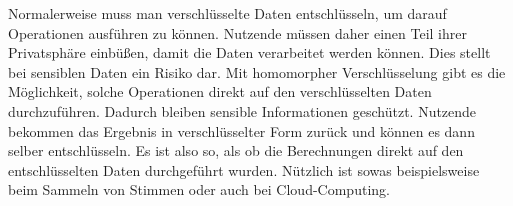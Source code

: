 \label{sec:einführung}
Normalerweise muss man verschlüsselte Daten entschlüsseln, um darauf Operationen ausführen zu können. Nutzende müssen daher einen Teil ihrer Privatsphäre einbüßen, damit die Daten verarbeitet werden können. Dies stellt bei sensiblen Daten ein Risiko dar. Mit homomorpher Verschlüsselung gibt es die Möglichkeit, solche Operationen direkt auf den verschlüsselten Daten durchzuführen. Dadurch bleiben sensible Informationen geschützt. Nutzende bekommen das Ergebnis in verschlüsselter Form zurück und können es dann selber entschlüsseln. Es ist also so, als ob die Berechnungen direkt auf den entschlüsselten Daten durchgeführt wurden. Nützlich ist sowas beispielsweise beim Sammeln von Stimmen oder auch bei Cloud-Computing.